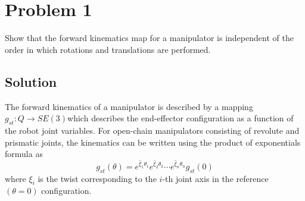 \section*{Problem 1}
\setcounter{section}{1}
\setcounter{equation}{0}

Show that the forward kinematics map for a manipulator is independent of the order in which rotations and translations are performed.

\subsection*{Solution}

The forward kinematics of a manipulator is described by a mapping \( g_{st} : Q \to SE (3) \)which describes the end-eﬀector configuration as a function of the robot joint variables.
For open-chain manipulators consisting of revolute and prismatic joints, the kinematics can be written using the product of exponentials formula as
\begin{equation}
    g_{st}(\theta)
    =
    e^{\widehat{\xi}_1 \theta_1}
    e^{\widehat{\xi}_2 \theta_2}
    \cdots
    e^{\widehat{\xi}_n \theta_n}
    g_{st}(0)
\end{equation}
where \( \xi_{i} \) is the twist corresponding to the \(i\)-th joint axis in the reference \( (\theta = 0) \) conﬁguration.
